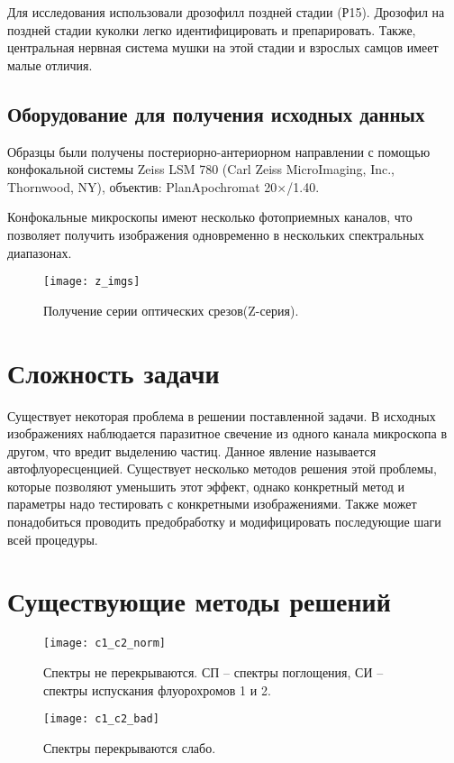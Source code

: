 Для исследования использовали дрозофилл поздней стадии (Р15). Дрозофил на поздней стадии куколки легко идентифицировать и препарировать. Также, центральная нервная система мушки на этой стадии и взрослых самцов имеет малые отличия.

\subsection{Оборудование для получения исходных данных}
Образцы были получены постериорно-антериорном направлении с помощью конфокальной системы Zeiss LSM 780 (Carl Zeiss MicroImaging, Inc., Thornwood, NY), объектив: PlanApochromat 20×/1.40.

Конфокальные микроскопы имеют несколько
фотоприемных каналов, что позволяет получить изображения
одновременно в нескольких спектральных диапазонах.  \cite{Inbook}
\begin{figure}[H]
	\centering
	\texttt{[image: z\_imgs]}
	\caption{Получение серии оптических срезов(Z-серия).}
	\label{z_imgs}
\end{figure}




\section{Сложность задачи} \label{ch1:sec3}
Существует некоторая проблема в решении поставленной задачи. В исходных изображениях наблюдается паразитное свечение из одного канала микроскопа в другом, что вредит выделению частиц. Данное явление называется автофлуоресценцией. Существует несколько методов решения этой проблемы, которые позволяют уменьшить этот эффект, однако конкретный метод и параметры надо тестировать с конкретными изображениями. Также может понадобиться проводить предобработку и модифицировать последующие шаги всей процедуры. 

\section{Существующие методы решений} \label{ch1:sec4}
\begin{figure}[H]
	\centering
	\texttt{[image: c1\_c2\_norm]}
	\caption{Спектры не перекрываются. СП –
		спектры поглощения, СИ – спектры испускания флуорохромов 1 и 2.}
	\label{c1_c2_norm}
\end{figure}

\begin{figure}[H]
	\centering
	\texttt{[image: c1\_c2\_bad]}
	\caption{Спектры перекрываются слабо.}
	\label{c1_c2_bad}
\end{figure}

